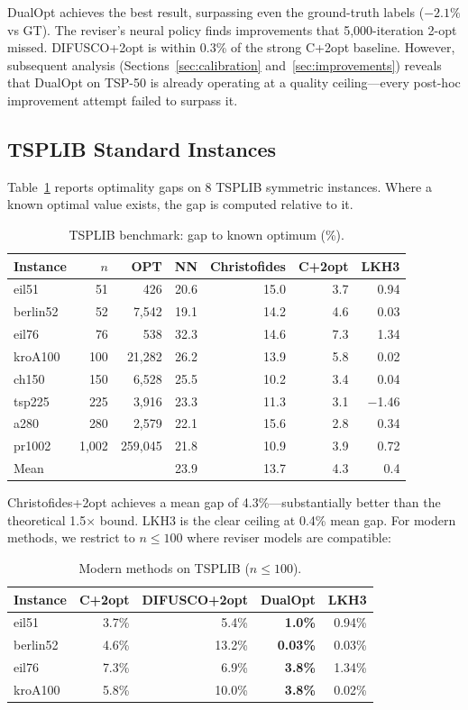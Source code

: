 \documentclass[11pt,a4paper]{article}
\begin{document}
DualOpt achieves the best result, surpassing even the ground-truth labels ($-2.1\%$ vs GT). The reviser's neural policy finds improvements that 5,000-iteration 2-opt missed. DIFUSCO+2opt is within 0.3\% of the strong C+2opt baseline. However, subsequent analysis (Sections~\ref{sec:calibration} and~\ref{sec:improvements}) reveals that DualOpt on TSP-50 is already operating at a quality ceiling---every post-hoc improvement attempt failed to surpass it.

\subsection{TSPLIB Standard Instances}

Table~\ref{tab:tsplib} reports optimality gaps on 8 TSPLIB symmetric instances. Where a known optimal value exists, the gap is computed relative to it.

\begin{table}[H]
\centering
\footnotesize
\caption{TSPLIB benchmark: gap to known optimum (\%).}
\label{tab:tsplib}
\begin{tabular}{@{}lrrrrrr@{}}
\toprule
Instance & $n$ & OPT & NN & Christofides & C+2opt & LKH3 \\
\midrule
eil51 & 51 & 426 & 20.6 & 15.0 & 3.7 & 0.94 \\
berlin52 & 52 & 7,542 & 19.1 & 14.2 & 4.6 & 0.03 \\
eil76 & 76 & 538 & 32.3 & 14.6 & 7.3 & 1.34 \\
kroA100 & 100 & 21,282 & 26.2 & 13.9 & 5.8 & 0.02 \\
ch150 & 150 & 6,528 & 25.5 & 10.2 & 3.4 & 0.04 \\
tsp225 & 225 & 3,916 & 23.3 & 11.3 & 3.1 & $-$1.46 \\
a280 & 280 & 2,579 & 22.1 & 15.6 & 2.8 & 0.34 \\
pr1002 & 1,002 & 259,045 & 21.8 & 10.9 & 3.9 & 0.72 \\
\midrule
Mean & & & 23.9 & 13.7 & 4.3 & 0.4 \\
\bottomrule
\end{tabular}
\end{table}

Christofides+2opt achieves a mean gap of 4.3\%---substantially better than the theoretical 1.5$\times$ bound. LKH3 is the clear ceiling at 0.4\% mean gap. For modern methods, we restrict to $n \leq 100$ where reviser models are compatible:

\begin{table}[H]
\centering
\footnotesize
\caption{Modern methods on TSPLIB ($n \leq 100$).}
\begin{tabular}{@{}lrrrr@{}}
\toprule
Instance & C+2opt & DIFUSCO+2opt & DualOpt & LKH3 \\
\midrule
eil51 & 3.7\% & 5.4\% & \textbf{1.0\%} & 0.94\% \\
berlin52 & 4.6\% & 13.2\% & \textbf{0.03\%} & 0.03\% \\
eil76 & 7.3\% & 6.9\% & \textbf{3.8\%} & 1.34\% \\
kroA100 & 5.8\% & 10.0\% & \textbf{3.8\%} & 0.02\% \\
\bottomrule
\end{tabular}
\end{table}
\end{document}

